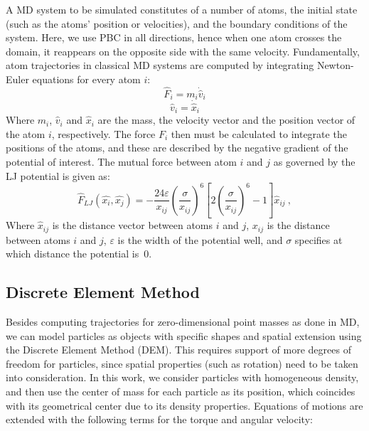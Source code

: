 \documentclass[preprint,12pt]{elsarticle}
\begin{document}
A \ac{MD} system to be simulated constitutes of a number of atoms, the initial state (such as the atoms' position or velocities), and the boundary conditions of the system.
Here, we use \ac{PBC} in all directions, hence when one atom crosses the domain, it reappears on the opposite side with the same velocity.
Fundamentally, atom trajectories in classical \ac{MD} systems are computed by integrating Newton-Euler equations for every atom $i$:
\begin{equation}
    \hat F_i = m_i \dot{\hat v}_i \label{eq:newton_force}
\end{equation}
\begin{equation}
    \hat v_i = \dot{\hat x}_i \label{eq:newton_velocity}
\end{equation}
Where $m_i$, $\hat v_i$ and $\hat x_i$ are the mass, the velocity vector and the position vector of the atom $i$, respectively.
The force $F_i$ then must be calculated to integrate the positions of the atoms, and these are described by the negative gradient of the potential of interest.
The mutual force between atom $i$ and $j$ as governed by the \ac{LJ} potential
is given as:
\begin{equation}
    \hat{F}_{LJ}(\hat{x_i}, \hat{x_j}) = -\frac{24\varepsilon}{x_{ij}} \left( \frac{\sigma}{x_{ij}} \right)^{6} \left[ 2\left(\frac{\sigma}{x_{ij}}\right)^{6} - 1\right] \hat{x}_{ij}~,
    \label{eq:lennard_jones}
\end{equation}
Where $\hat{x}_{ij}$ is the distance vector between atoms $i$ and $j$, $x_{ij}$ is the distance between atoms $i$ and $j$, $\varepsilon$ is the width of the potential well, and $\sigma$ specifies at which distance the potential is~$0$.

\subsection{Discrete Element Method}
\label{sec:dem}

Besides computing trajectories for zero-dimensional point masses as done in MD, we can model particles as objects with specific shapes and spatial extension using the Discrete Element Method (DEM).
This requires support of more degrees of freedom for particles, since spatial properties (such as rotation) need to be taken into consideration.
In this work, we consider particles with homogeneous density, and then use the center of mass for each particle as its position, which coincides with its geometrical center due to its density properties.
Equations of motions are extended with the following terms for the torque and angular velocity:
\end{document}
